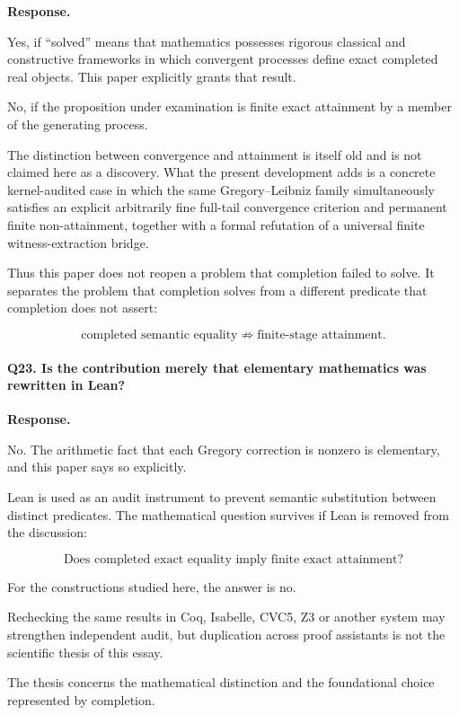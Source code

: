 \documentclass[11pt,a4paper]{article}
\begin{document}
\textbf{Response.}

Yes, if ``solved'' means that mathematics possesses rigorous classical
and constructive frameworks in which convergent processes define exact
completed real objects. This paper explicitly grants that result.

No, if the proposition under examination is finite exact attainment by
a member of the generating process.

The distinction between convergence and attainment is itself old and
is not claimed here as a discovery. What the present development adds
is a concrete kernel-audited case in which the same Gregory--Leibniz
family simultaneously satisfies an explicit arbitrarily fine
full-tail convergence criterion and permanent finite non-attainment,
together with a formal refutation of a universal finite
witness-extraction bridge.

Thus this paper does not reopen a problem that completion failed to
solve. It separates the problem that completion solves from a
different predicate that completion does not assert:

\[
\boxed{
\text{completed semantic equality}
\not\Rightarrow
\text{finite-stage attainment}.
}
\]


\paragraph{Q23. Is the contribution merely that elementary mathematics
was rewritten in Lean?}

\textbf{Response.}

No. The arithmetic fact that each Gregory correction is nonzero is
elementary, and this paper says so explicitly.

Lean is used as an audit instrument to prevent semantic substitution
between distinct predicates. The mathematical question survives if
Lean is removed from the discussion:

\[
\boxed{
\text{Does completed exact equality imply finite exact attainment?}
}
\]

For the constructions studied here, the answer is no.

Rechecking the same results in Coq, Isabelle, CVC5, Z3 or another
system may strengthen independent audit, but duplication across proof
assistants is not the scientific thesis of this essay.

The thesis concerns the mathematical distinction and the foundational
choice represented by completion.
\end{document}
